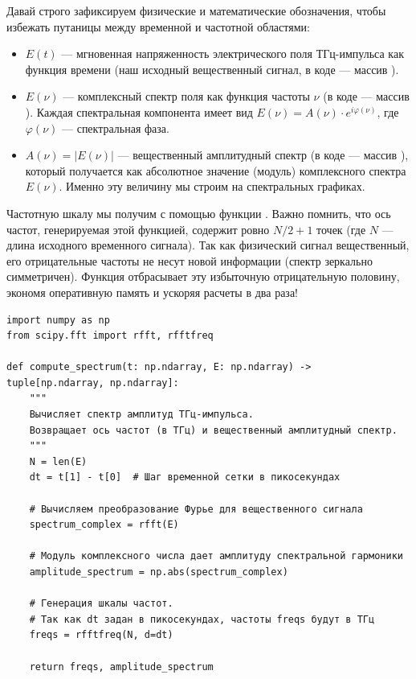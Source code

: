 Давай строго зафиксируем физические и математические обозначения, чтобы избежать путаницы между временной и частотной областями:
\begin{itemize}
    \item $E(t)$ — мгновенная напряженность электрического поля ТГц-импульса как функция времени (наш исходный вещественный сигнал, в коде — массив ).
    \item $E(\nu)$ — комплексный спектр поля как функция частоты $\nu$ (в коде — массив ). Каждая спектральная компонента имеет вид $E(\nu) = A(\nu) \cdot e^{i \varphi(\nu)}$, где $\varphi(\nu)$ — спектральная фаза.
    \item $A(\nu) = |E(\nu)|$ — вещественный амплитудный спектр (в коде — массив ), который получается как абсолютное значение (модуль) комплексного спектра $E(\nu)$. Именно эту величину мы строим на спектральных графиках.
\end{itemize}

Частотную шкалу мы получим с помощью функции . Важно помнить, что ось частот, генерируемая этой функцией, содержит ровно $N/2 + 1$ точек (где $N$ --- длина исходного временного сигнала). Так как физический сигнал вещественный, его отрицательные частоты не несут новой информации (спектр зеркально симметричен). Функция  отбрасывает эту избыточную отрицательную половину, экономя оперативную память и ускоряя расчеты в два раза!

\begin{listing}[H]
	\caption{Вычисление спектра амплитуд ()}\label{lst:compute_spectrum}
	\begin{verbatim}
import numpy as np
from scipy.fft import rfft, rfftfreq

def compute_spectrum(t: np.ndarray, E: np.ndarray) -> tuple[np.ndarray, np.ndarray]:
    """
    Вычисляет спектр амплитуд ТГц-импульса.
    Возвращает ось частот (в ТГц) и вещественный амплитудный спектр.
    """
    N = len(E)
    dt = t[1] - t[0]  # Шаг временной сетки в пикосекундах
    
    # Вычисляем преобразование Фурье для вещественного сигнала
    spectrum_complex = rfft(E)
    
    # Модуль комплексного числа дает амплитуду спектральной гармоники
    amplitude_spectrum = np.abs(spectrum_complex)
    
    # Генерация шкалы частот.
    # Так как dt задан в пикосекундах, частоты freqs будут в ТГц
    freqs = rfftfreq(N, d=dt)
    
    return freqs, amplitude_spectrum
	\end{verbatim}
\end{listing}



